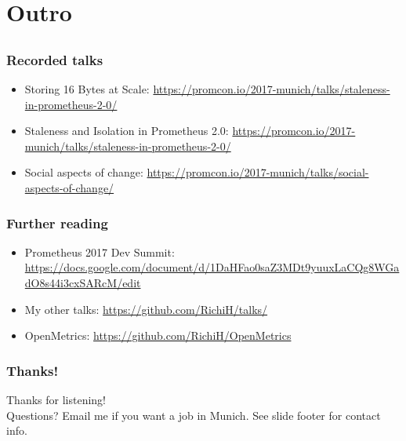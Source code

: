 \documentclass[t]{beamer}
\begin{document}
\section{Outro}


\subsection{}


\begin{frame}
	\frametitle{Recorded talks}
	\begin{itemize}
		\item Storing 16 Bytes at Scale: \url{https://promcon.io/2017-munich/talks/staleness-in-prometheus-2-0/}
		\item Staleness and Isolation in Prometheus 2.0: \url{https://promcon.io/2017-munich/talks/staleness-in-prometheus-2-0/}
		\item Social aspects of change: \url{https://promcon.io/2017-munich/talks/social-aspects-of-change/}
	\end{itemize}
\end{frame}


\begin{frame}
	\frametitle{Further reading}
	\begin{itemize}
		\item Prometheus 2017 Dev Summit: \url{https://docs.google.com/document/d/1DaHFao0saZ3MDt9yuuxLaCQg8WGadO8s44i3cxSARcM/edit}
		\item My other talks: \url{https://github.com/RichiH/talks/}
		\item OpenMetrics: \url{https://github.com/RichiH/OpenMetrics}
	\end{itemize}
\end{frame}

\begin{frame}
	\frametitle{Thanks!}
		\begin{center}
			\vfill
			Thanks for listening!\\
			\vfill
			Questions?
			\vfill
			Email me if you want a job in Munich.
			\vfill
			See slide footer for contact info.
			\vfill
		\end{center}
\end{frame}
\end{document}
